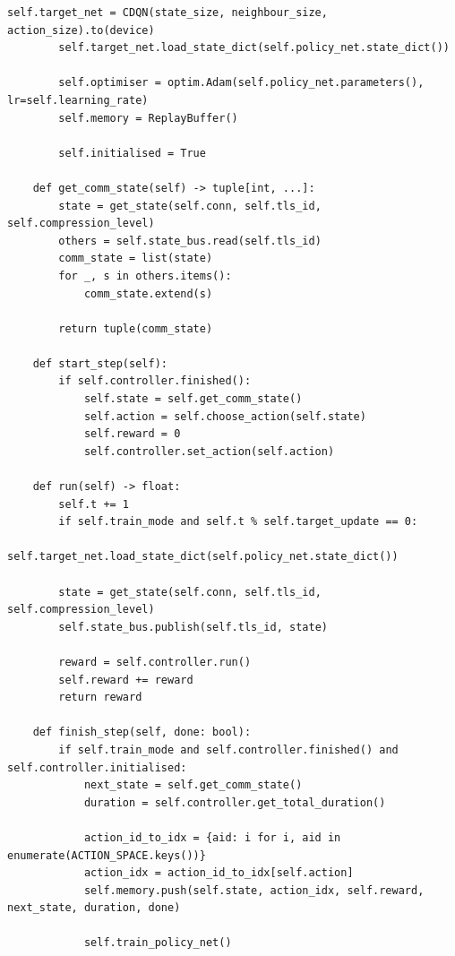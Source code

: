 \documentclass[a4paper]{report}
\begin{document}
\begin{lstlisting}[style=pythonstyle]
        self.target_net = CDQN(state_size, neighbour_size, action_size).to(device)
        self.target_net.load_state_dict(self.policy_net.state_dict())

        self.optimiser = optim.Adam(self.policy_net.parameters(), lr=self.learning_rate)
        self.memory = ReplayBuffer()

        self.initialised = True

    def get_comm_state(self) -> tuple[int, ...]:
        state = get_state(self.conn, self.tls_id, self.compression_level)
        others = self.state_bus.read(self.tls_id)
        comm_state = list(state)
        for _, s in others.items():
            comm_state.extend(s)

        return tuple(comm_state)

    def start_step(self):
        if self.controller.finished():
            self.state = self.get_comm_state()
            self.action = self.choose_action(self.state)
            self.reward = 0
            self.controller.set_action(self.action)

    def run(self) -> float:
        self.t += 1
        if self.train_mode and self.t % self.target_update == 0:
            self.target_net.load_state_dict(self.policy_net.state_dict())

        state = get_state(self.conn, self.tls_id, self.compression_level)
        self.state_bus.publish(self.tls_id, state)

        reward = self.controller.run()
        self.reward += reward
        return reward

    def finish_step(self, done: bool):
        if self.train_mode and self.controller.finished() and self.controller.initialised:
            next_state = self.get_comm_state()
            duration = self.controller.get_total_duration()

            action_id_to_idx = {aid: i for i, aid in enumerate(ACTION_SPACE.keys())}
            action_idx = action_id_to_idx[self.action]
            self.memory.push(self.state, action_idx, self.reward, next_state, duration, done)

            self.train_policy_net()
\end{lstlisting}
\end{document}
